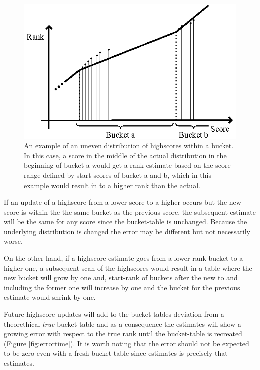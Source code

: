 \begin{figure}[h!]
  \centering
  \caption{An example of an uneven distribution of highscores within a bucket.
    In this case, a score in the middle of the actual distribution in the beginning of bucket a would get a rank estimate based on the score range defined by start scores of bucket a and b, which in this example would result in to a higher rank than the actual.}
  \label{fig:uneven}
  \includegraphics[width=13cm]{img/uneven_distribution.eps}
\end{figure}

If an update of a highscore from a lower score to a higher occurs but the new score is within the the same bucket as the previous score, the subsequent estimate will be the same for any score since the bucket-table is unchanged. Because the underlying distribution is changed the error may be different but not necessarily worse.


On the other hand, if a highscore estimate goes from a lower rank bucket to a higher one, a subsequent scan of the highscores would result in a table where the new bucket will grow by one and, start-rank of buckets after the new to and including the former one will increase by one and the bucket for the previous estimate would shrink by one.



Future highscore updates will add to the bucket-tables deviation from a theorethical \emph{true} bucket-table and as a consequence the estimates will show a growing error with respect to the true rank until the bucket-table is recreated (Figure \ref{fig:errortime}). It is worth noting that the error should not be expected to be zero even with a fresh bucket-table since estimates is precisely that -- estimates.

